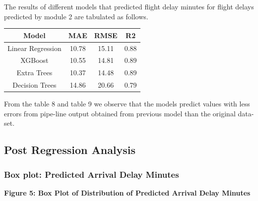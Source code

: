 \documentclass{article}
\begin{document}
The results of different models that predicted flight delay minutes for flight delays predicted by module 2 are tabulated as follows.

\begin{center}
 \label{tab:title} 
\begin{tabular}{ |c|c|c|c| } 
 \hline
 \textbf{Model} & \textbf{MAE} & \textbf{RMSE} & \textbf{R2} \\
 \hline
 Linear Regression & 10.78 & 15.11 & 0.88 \\ 
 \hline
 XGBoost & 10.55 & 14.81 & 0.89 \\
 \hline
 Extra Trees & 10.37 & 14.48 & 0.89 \\
 \hline
 Decision Trees & 14.86 & 20.66 & 0.79 \\
 \hline
\end{tabular}
\end{center}
\bigbreak

From the table 8 and table 9 we observe that the models predict values with less errors from pipe-line output obtained from previous model than the original data-set.

\subsection{Post Regression Analysis}

\subsubsection{Box plot: Predicted Arrival Delay Minutes}

\begin{center}
    

\end{center}

\begin{center}
    \textbf{Figure 5: Box Plot of Distribution of Predicted Arrival Delay Minutes}
\end{center}
\end{document}
